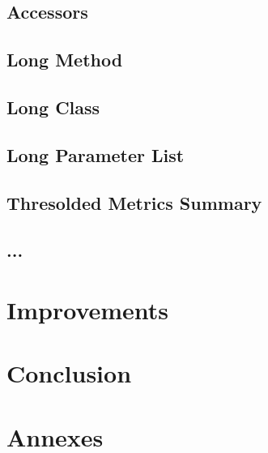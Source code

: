 \documentclass[11pt,a4paper]{article}
\begin{document}
\subsection{Accessors} 
\subsection{Long Method}
\subsection{Long Class}
\subsection{Long Parameter List}
\subsection{Thresolded Metrics Summary}
\subsection{...}
\section{Improvements}
\section{Conclusion}
\section{Annexes}
\end{document}
